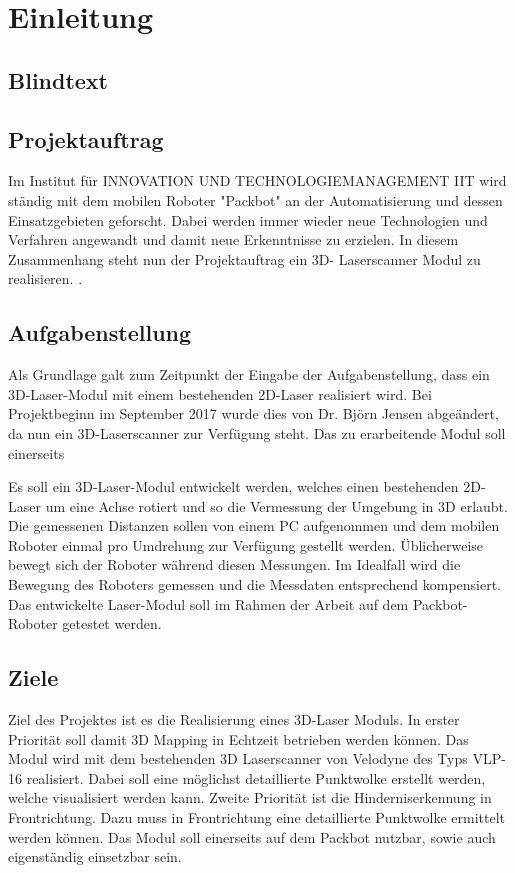 \chapter{Einleitung}
\label{Einleitung}

\section{Blindtext} 
\blinditemize

\section {Projektauftrag}
\label{Projektauftrag}
Im Institut für INNOVATION UND TECHNOLOGIEMANAGEMENT IIT wird ständig mit dem mobilen Roboter "Packbot" an der Automatisierung und dessen Einsatzgebieten geforscht. Dabei werden immer wieder neue Technologien und Verfahren angewandt und damit neue Erkenntnisse zu erzielen. In diesem Zusammenhang steht nun der Projektauftrag ein 3D- Laserscanner Modul zu realisieren.   
.

\section{Aufgabenstellung}
\label{Aufgabenstellung}
Als Grundlage galt zum Zeitpunkt der Eingabe der Aufgabenstellung, dass ein 3D-Laser-Modul mit einem bestehenden 2D-Laser realisiert wird. Bei Projektbeginn im September 2017 wurde dies von Dr. Björn Jensen abgeändert, da nun ein 3D-Laserscanner zur Verfügung steht. Das zu erarbeitende Modul soll einerseits   


Es soll ein 3D-Laser-Modul entwickelt werden, welches einen bestehenden 2D-Laser um eine Achse
rotiert und so die Vermessung der Umgebung in 3D erlaubt. Die gemessenen Distanzen sollen
von einem PC aufgenommen und dem mobilen Roboter einmal pro Umdrehung zur Verfügung gestellt
werden.
Üblicherweise bewegt sich der Roboter während diesen Messungen. Im Idealfall wird die Bewegung
des Roboters gemessen und die Messdaten entsprechend kompensiert.
Das entwickelte Laser-Modul soll im Rahmen der Arbeit auf dem Packbot-Roboter getestet werden.




\section{Ziele}
\label{Ziele}
Ziel des Projektes ist es die Realisierung eines 3D-Laser Moduls. In erster Priorität soll damit 3D Mapping in Echtzeit betrieben werden können. Das Modul wird mit dem bestehenden 3D Laserscanner von Velodyne des Typs VLP-16 realisiert. Dabei soll eine möglichst detaillierte Punktwolke erstellt werden, welche visualisiert werden kann. Zweite Priorität ist die Hinderniserkennung in Frontrichtung. Dazu muss in Frontrichtung eine detaillierte Punktwolke ermittelt werden können. Das Modul soll einerseits auf dem Packbot nutzbar, sowie auch eigenständig einsetzbar sein.